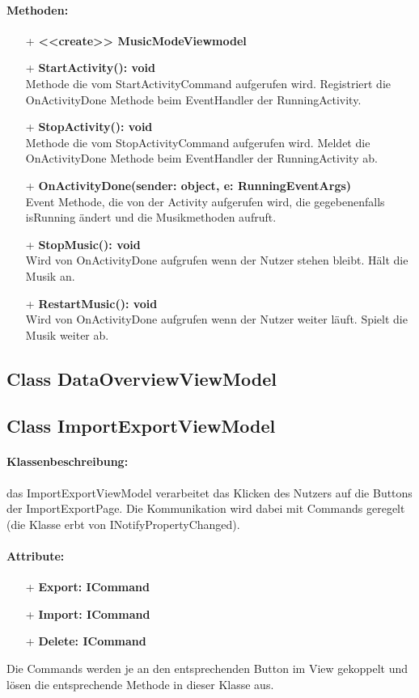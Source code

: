 \documentclass[a4paper,12pt]{article}
\begin{document}
\paragraph{Methoden:}
\begin{itemize}
	\item[+] \textbf{<<create>> MusicModeViewmodel} \\
	\item[+] \textbf{StartActivity(): void} \\ Methode die vom StartActivityCommand aufgerufen wird. Registriert die OnActivityDone Methode beim EventHandler der RunningActivity. 
	\item[+] \textbf{StopActivity(): void} \\ Methode die vom StopActivityCommand aufgerufen wird. Meldet die OnActivityDone Methode beim EventHandler der RunningActivity ab. 
	\item[+] \textbf{OnActivityDone(sender: object, e: RunningEventArgs)} \\ Event Methode, die von der Activity aufgerufen wird, die gegebenenfalls isRunning ändert und die Musikmethoden aufruft.
	\item[+] \textbf{StopMusic(): void} \\ Wird von OnActivityDone aufgrufen wenn der Nutzer stehen bleibt. Hält die Musik an.
	\item[+] \textbf{RestartMusic(): void} \\ Wird von OnActivityDone aufgrufen wenn der Nutzer weiter läuft. Spielt die Musik weiter ab.
\end{itemize}

\subsection{Class DataOverviewViewModel}

\subsection{Class ImportExportViewModel}

\paragraph{Klassenbeschreibung:}
das ImportExportViewModel verarbeitet das Klicken des Nutzers auf die Buttons  der ImportExportPage.
Die Kommunikation wird dabei mit Commands geregelt (die Klasse erbt von INotifyPropertyChanged).
\paragraph{Attribute:}
\begin{itemize}
	\item[+] \textbf{Export: ICommand}
	\item[+] \textbf{Import: ICommand}
	\item[+] \textbf{Delete: ICommand}
\end{itemize}
Die Commands werden je an den entsprechenden Button im View gekoppelt und lösen die entsprechende Methode in dieser Klasse aus.
\end{document}
